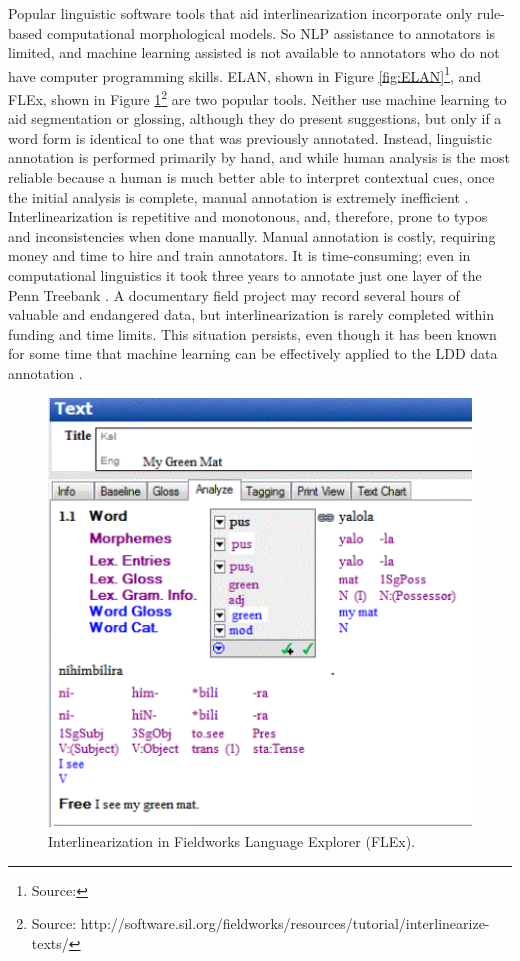 \documentclass[12pt]{article}
\begin{document}
Popular linguistic software tools that aid interlinearization incorporate only rule-based computational morphological models. So NLP assistance to annotators is limited, and machine learning assisted is not available to annotators who do not have computer programming skills. ELAN, shown in Figure \ref{fig:ELAN}\footnote{Source: }, and FLEx, shown in Figure \ref{fig:FLEX}\footnote{Source: http://software.sil.org/fieldworks/resources/tutorial/interlinearize-texts/} are two popular tools. Neither use machine learning to aid segmentation or glossing, although they do present suggestions, but only if a word form is identical to one that was previously annotated. Instead, linguistic annotation is performed primarily by hand, and while human analysis is the most reliable because a human is much better able to interpret contextual cues, once the initial analysis is complete, manual annotation is extremely inefficient \cite{Baldridge06,baldridge_how_2009,palmer_semi-automated_2009}. Interlinearization is repetitive and monotonous, and, therefore, prone to typos and inconsistencies when done manually. Manual annotation is costly, requiring money and time to hire and train annotators. It is time-consuming; even in computational linguistics it took three years to annotate just one layer of the Penn Treebank \cite{taylor_penn_2003} \cite{duong_natural_2017,he_humanloop_2016}. A documentary field project may record several hours of valuable and endangered data, but interlinearization is rarely completed within funding and time limits. This situation persists, even though it has been known for some time that machine learning can be effectively applied to the LDD data annotation \cite{baldridge_how_2009,palmer_semi-automated_2009,duong_natural_2017}.

\begin{figure}[ht]
\begin{center}
\includegraphics[width=0.40\columnwidth]{FLExIGT.png}
\caption{Interlinearization in Fieldworks Language Explorer (FLEx).}
\label{fig:FLEX}
\end{center}
\end{figure}
\end{document}
